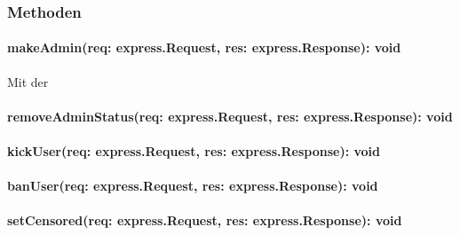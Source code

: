 \documentclass{entwurfsheft}
\begin{document}
\subsubsection*{Methoden}
\paragraph{makeAdmin(req: express.Request, res: express.Response): void}
Mit der 
\paragraph{removeAdminStatus(req: express.Request, res: express.Response): void}
\paragraph{kickUser(req: express.Request, res: express.Response): void}
\paragraph{banUser(req: express.Request, res: express.Response): void}
\paragraph{setCensored(req: express.Request, res: express.Response): void}


\newpage
\end{document}
